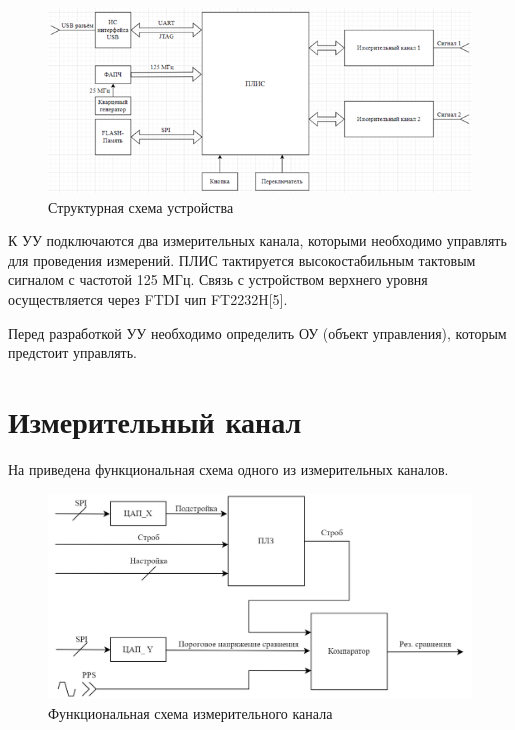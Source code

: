 \begin{figure}[ht!] 
	\center
	\includegraphics {my_folder/images//scheme_struct}
	\caption{Структурная схема устройства} 
	\label{fig:scheme-struct}  
\end{figure}

К УУ подключаются два измерительных канала, которыми необходимо управлять для проведения измерений.
ПЛИС тактируется высокостабильным тактовым сигналом с частотой 125 МГц. Связь с устройством верхнего уровня
осуществляется через FTDI чип FT2232H[5].

Перед разработкой УУ необходимо определить ОУ (объект управления), которым предстоит управлять.

\FloatBarrier

\section{Измерительный канал}

На  приведена функциональная схема одного из измерительных каналов.

\FloatBarrier

\begin{figure}[ht!] 
	\center
	\includegraphics [scale=0.3] {my_folder/images//ch_func}
	\caption{Функциональная схема измерительного канала} 
	\label{fig:ch-func}  
\end{figure}

